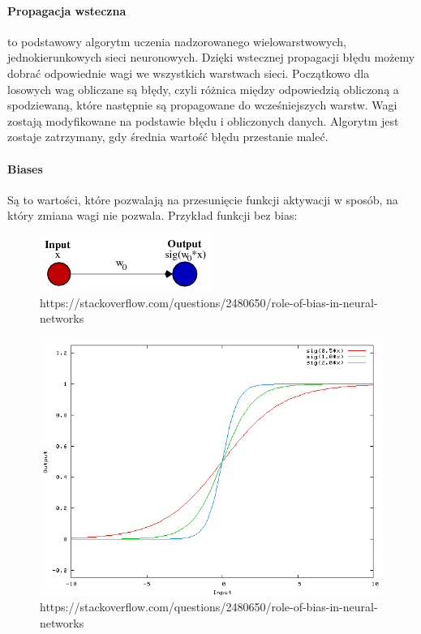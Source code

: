 \documentclass[12pt,a4paper]{article}
\begin{document}
\paragraph*{Propagacja wsteczna} to podstawowy algorytm uczenia nadzorowanego wielowarstwowych, jednokierunkowych sieci neuronowych. Dzięki wstecznej propagacji błędu możemy dobrać odpowiednie wagi we wszystkich warstwach sieci. Początkowo dla losowych wag obliczane są błędy, czyli różnica między odpowiedzią obliczoną a spodziewaną, które następnie są propagowane do wcześniejszych warstw. Wagi zostają modyfikowane na podstawie błędu i obliczonych danych. Algorytm jest zostaje zatrzymany, gdy średnia wartość błędu przestanie maleć.
\paragraph*{Biases} Są to wartości, które pozwalają na przesunięcie funkcji aktywacji w sposób, na który zmiana wagi nie pozwala. Przykład funkcji bez bias:
\begin{figure}[H]
\centering
\includegraphics[scale=0.7]{biases_01}
\caption{https://stackoverflow.com/questions/2480650/role-of-bias-in-neural-networks}
\end{figure}
\begin{figure}[H]
\centering
\includegraphics[scale=0.5]{biases_02}
\caption{https://stackoverflow.com/questions/2480650/role-of-bias-in-neural-networks}
\end{figure}\clearpage
\end{document}
